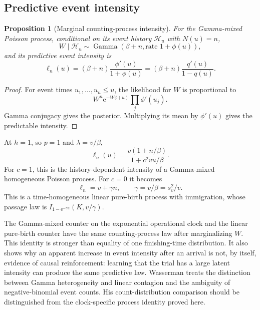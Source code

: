 \documentclass[12pt]{article}
\newcommand{\e}{\mathrm{e}}
\newcommand{\GammaDist}{\operatorname{Gamma}}
\theoremstyle{definition}
\theoremstyle{plain}
\newtheorem{proposition}{Proposition}
\theoremstyle{remark}
\begin{document}
\subsection{Predictive event intensity}
\begin{proposition}[Marginal counting-process intensity]\label{prop:intensity}
For the Gamma-mixed Poisson process, conditional on its event history $\mathcal H_u$ with $N(u)=n$,
\begin{equation}
 W\mid\mathcal H_u\sim\GammaDist(\beta+n,\text{rate }1+\phi(u)),
\end{equation}
and its predictive event intensity is
\begin{equation}
 \ell_n(u)=(\beta+n)\frac{\phi'(u)}{1+\phi(u)}
          =(\beta+n)\frac{q'(u)}{1-q(u)}.\label{eq:intensity}
\end{equation}
\end{proposition}
\begin{proof}
For event times $u_1,\ldots,u_n\leq u$, the likelihood for $W$ is proportional to
\begin{equation}
 W^n\e^{-W\phi(u)}\prod_j\phi'(u_j).
\end{equation}
Gamma conjugacy gives the posterior. Multiplying its mean by $\phi'(u)$ gives the predictable intensity.
\end{proof}
At $h=1$, so $p=1$ and $\lambda=v/\beta$,
\begin{equation}
 \ell_n(u)=\frac{v(1+n/\beta)}{1+c^2vu/\beta}.\label{eq:proper-intensity}
\end{equation}
For $c=1$, this is the history-dependent intensity of a Gamma-mixed homogeneous Poisson process. For $c=0$ it becomes
\begin{equation}
 \ell_n=v+\gamma n,\qquad \gamma=v/\beta=s_v^2/v.\label{eq:pure-birth}
\end{equation}
This is a time-homogeneous linear pure-birth process with immigration, whose passage law is $I_{1-\e^{-\gamma u}}(K,v/\gamma)$.

The Gamma-mixed counter on the exponential operational clock and the linear pure-birth counter have the same counting-process law after marginalizing $W$. This identity is stronger than equality of one finishing-time distribution. It also shows why an apparent increase in event intensity after an arrival is not, by itself, evidence of causal reinforcement: learning that the trial has a large latent intensity can produce the same predictive law. Wasserman \cite{Wasserman1983} treats the distinction between Gamma heterogeneity and linear contagion and the ambiguity of negative-binomial event counts. His count-distribution comparison should be distinguished from the clock-specific process identity proved here.
\end{document}
